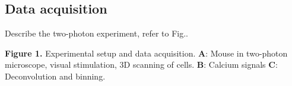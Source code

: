 \subsection{Data acquisition}
Describe the two-photon experiment, refer to Fig..

\textbf{Figure 1.}{
Experimental setup and data acquisition. 
\textbf{A}: Mouse in two-photon microscope, visual stimulation, 3D scanning of cells.
\textbf{B}: Calcium signals
\textbf{C}: Deconvolution and binning.
}\label{fig:01}
